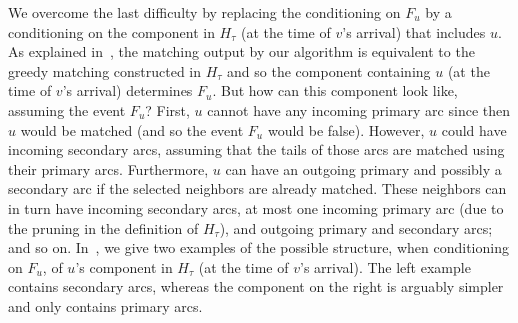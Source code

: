 We overcome the last difficulty by replacing the conditioning on $F_u$ by a conditioning on the component in $H_\tau$ (at the time of $v$'s arrival) that includes $u$. As explained in~, the matching output by our algorithm is equivalent to the greedy matching constructed in $H_\tau$ and so the component containing $u$ (at the time of $v$'s arrival) determines $F_u$. But how can this component look like, assuming the event $F_u$? First, $u$ cannot have any incoming primary arc since then $u$ would be matched (and so the event $F_u$ would be false). However, $u$ could have incoming secondary arcs, assuming that the tails of those arcs are matched using their primary arcs. Furthermore, $u$ can have an outgoing primary and possibly a secondary arc if the selected neighbors are already matched. These neighbors can in turn have incoming secondary arcs, at most one incoming primary arc (due to the pruning in the definition of $H_\tau$),  and outgoing primary and secondary arcs; and so on. In~, we give two examples  of the possible structure, when conditioning on $F_u$,  of $u$'s component in $H_\tau$  (at the time of  $v$'s arrival).
The left example contains secondary arcs, whereas the component on the right is arguably simpler and only contains primary arcs. 

